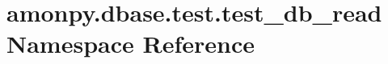 \hypertarget{namespaceamonpy_1_1dbase_1_1test_1_1test__db__read}{\section{amonpy.\-dbase.\-test.\-test\-\_\-db\-\_\-read Namespace Reference}
\label{namespaceamonpy_1_1dbase_1_1test_1_1test__db__read}
}
